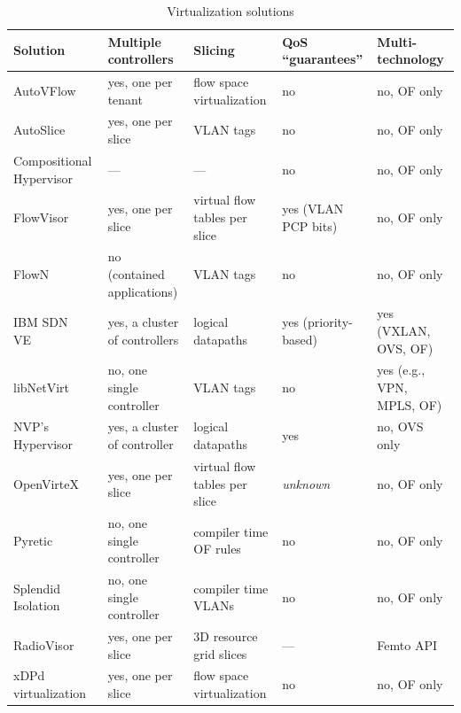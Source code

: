 {\renewcommand{\arraystretch}{1.4}
\begin{table}[!htp]
\caption{Virtualization solutions}
\label{tab:virtualizationsolutions}
\begin{center}
\footnotesize
\begin{tabularx}{\textwidth}{p{3.8cm}p{3.1cm}p{3.1cm}p{2.6cm}X}
\hline
\textbf{Solution} & \textbf{Multiple controllers} & \textbf{Slicing} & \textbf{QoS ``guarantees''} & \textbf{Multi-technology} \\\hline

{AutoVFlow~\cite{Yamanaka2014}} & {yes, one per tenant} & {flow space virtualization} & {no}  & {no, OF only} \\
\hline

AutoSlice~\cite{bozakov2012} & yes, one per slice & VLAN tags & no & no, OF only\\\hline

{Compositional Hypervisor~\cite{Jin2014_4}} & {---} & {---} & {no}  & {no, OF only} \\
\hline

FlowVisor~\cite{sherwood2009,azodolmolky2012} & yes, one per slice & virtual flow tables per slice &  yes (VLAN PCP bits) & no, OF only \\\hline
FlowN~\cite{drutskoy2012,drutskoy2013} & no (contained applications) & VLAN tags  & no & no, OF only \\\hline
IBM SDN VE~\cite{racherla2014} & yes, a cluster of controllers & logical datapaths & yes (priority-based) & yes (VXLAN, OVS, OF) \\\hline
libNetVirt~\cite{turull2012} & no, one single controller & VLAN tags & no  & yes (e.g., VPN, MPLS, OF)\\\hline
NVP's Hypervisor~\cite{koponen} & yes, a cluster of controller & logical datapaths & yes & no, OVS only \\\hline
OpenVirteX~\cite{Al_Shabibi2014_4} & yes, one per slice & virtual flow tables per slice & \textit{unknown}  & no, OF only \\\hline 
Pyretic~\cite{reich2013} & no, one single controller & compiler time OF rules & no & no, OF only \\\hline
Splendid Isolation~\cite{gutz2012} & no, one single controller & compiler time VLANs & no  & no, OF only \\\hline

{RadioVisor~\cite{Gudipati2014_4}} & {yes, one per slice} & {3D resource grid slices} & {---}  & {Femto API~\cite{smallcellforum2013}} \\
\hline

{xDPd virtualization~\cite{doriguzzicorin2014}} & {yes, one per slice} & {flow space virtualization} & {no}  & {no, OF only} \\
\hline

\end{tabularx}
\end{center}
\end{table}
}


